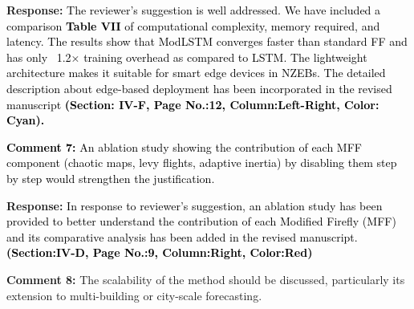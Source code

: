\documentclass[12pt]{article}
\begin{document}
\hspace{-1.5em}\textbf{Response:}
\noindent\textcolor{black}{The reviewer's suggestion is well addressed. We have included a comparison \textbf{Table VII} of computational complexity, memory required, and latency. The results show that ModLSTM converges faster than standard FF and has only ~1.2× training overhead as compared to LSTM. The lightweight architecture makes it suitable for smart edge devices in NZEBs. The detailed description about edge-based deployment
has been incorporated in the revised manuscript \textbf{(Section: IV-F, Page No.:12, Column:Left-Right, Color: Cyan).}}\newline
\newline




\noindent\textcolor{black}{\noindent\textbf{Comment 7:} An ablation study showing the contribution of each MFF component (chaotic maps, levy flights, adaptive inertia) by disabling them step by step would strengthen the justification.}
\vspace{0.15cm}



\hspace{-1.5em}\textbf{Response:} \noindent\textcolor{black}{In response to reviewer's suggestion, an ablation study has been provided to better understand the contribution of each Modified Firefly (MFF) and its comparative analysis has been added in the revised manuscript. \textbf{(Section:IV-D, Page No.:9, Column:Right, Color:Red)}}\newline
\newline






\noindent\textbf{Comment 8:} The scalability of the method should be discussed, particularly its extension to multi-building or city-scale forecasting.
\vspace{0.15cm}

\end{document}
